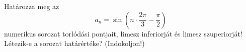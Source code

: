 \documentclass[11pt]{scrartcl}
\begin{document}
Határozza meg az
\[
	a_n = \sin\left(n \cdot \frac{2\pi}{3} - \frac{\pi}{2}\right)
\]
numerikus sorozat torlódási pontjait, limesz inferiorját és limesz
szuperiorját! Létezik-e a sorozat határértéke? (Indokoljon!)
\end{document}
